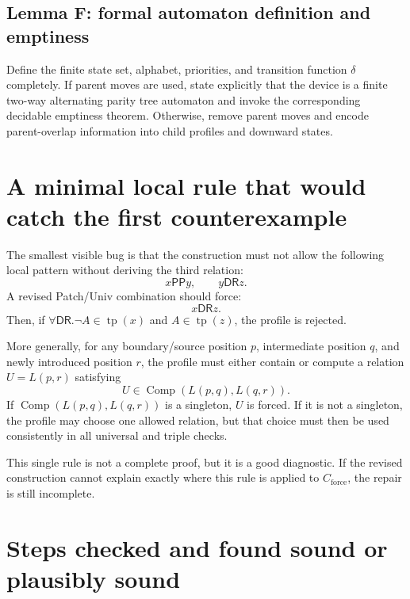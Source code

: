 \documentclass[11pt]{article}
\newcommand{\PP}{\mathsf{PP}}
\newcommand{\DR}{\mathsf{DR}}
\newcommand{\Comp}{\operatorname{Comp}}
\newcommand{\tp}{\operatorname{tp}}
\begin{document}
\subsection{Lemma F: formal automaton definition and emptiness}

Define the finite state set, alphabet, priorities, and transition function $\delta$ completely.  If parent moves are used, state explicitly that the device is a finite two-way alternating parity tree automaton and invoke the corresponding decidable emptiness theorem.  Otherwise, remove parent moves and encode parent-overlap information into child profiles and downward states.

\section{A minimal local rule that would catch the first counterexample}

The smallest visible bug is that the construction must not allow the following local pattern without deriving the third relation:
\[
  x\PP y, \qquad y\DR z.
\]
A revised \textsf{Patch}/\textsf{Univ} combination should force:
\[
  x\DR z.
\]
Then, if $\forall\DR.\neg A\in\tp(x)$ and $A\in\tp(z)$, the profile is rejected.

More generally, for any boundary/source position $p$, intermediate position $q$, and newly introduced position $r$, the profile must either contain or compute a relation $U=L(p,r)$ satisfying
\[
  U\in\Comp(L(p,q),L(q,r)).
\]
If $\Comp(L(p,q),L(q,r))$ is a singleton, $U$ is forced.  If it is not a singleton, the profile may choose one allowed relation, but that choice must then be used consistently in all universal and triple checks.

This single rule is not a complete proof, but it is a good diagnostic.  If the revised construction cannot explain exactly where this rule is applied to $C_{\mathrm{force}}$, the repair is still incomplete.

\section{Steps checked and found sound or plausibly sound}
\end{document}
